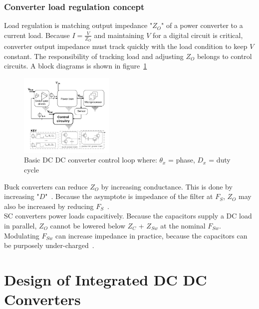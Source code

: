 \documentclass[letterpaper,twocolumn,10pt]{article}
\begin{document}
\subsubsection{Converter load regulation concept}
Load regulation is matching output impedance "$Z_O$" of a power converter to a current load. Because $I= \frac{V}{Z_O}$ and maintaining $V$ for a digital circuit is critical, converter output impedance must track quickly with the load condition to keep $V$ constant. The responsibility of tracking load and adjusting $Z_O$ belongs to control circuits. A block diagrams is shown in figure~\ref{ControlCKBlockDiags}\\
\begin{figure}[here]
\includegraphics[width=0.4\textwidth]{BasicControlBlockDiag}
\caption{Basic DC DC converter control loop where:
$\theta_x$ = phase, $D_x$ = duty cycle}
\label{ControlCKBlockDiags}
\end{figure}
Buck converters can reduce $Z_O$ by increasing conductance. This is done by increasing "$D$"~\cite{Kurson2006}. Because the asymptote is impedance of the filter at $F_S$, $Z_O$ may also be increased by reducing $F_S$~\cite{Alghamdi2012}.\\ %
SC converters power loads capacitively. Because the capacitors supply a DC load in parallel, $Z_O$ cannot be lowered below $Z_C$ + $Z_{Sw}$ at the nominal $F_{Sw}$. Modulating $F_{Sw}$ can increase impedance in practice, because the capacitors can be purposely under-charged~\cite{Seeman2008}.\\

\section{Design of Integrated DC DC Converters} \label{DesignOfIntegratedDCDCConverters}
\end{document}
